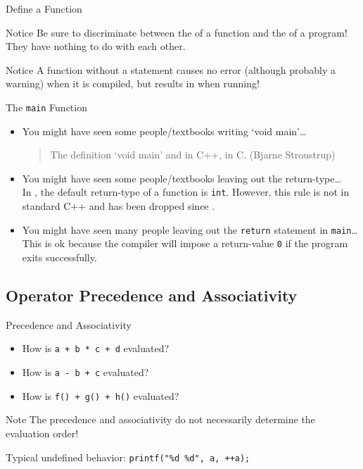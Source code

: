 \documentclass[handout]{beamer}
\begin{document}
\begin{frame}{Define a Function}
    \begin{alertblock}{Notice}
        Be sure to discriminate between the  of a function and the  of a program! They have nothing to do with each other.
    \end{alertblock}
    \pause
    \begin{alertblock}{Notice}
        A  function without a  statement causes no error (although probably a warning) when it is compiled, but results in  when running!
    \end{alertblock}
\end{frame}

\begin{frame}{The \texttt{main} Function}
    \begin{itemize}
        \item You might have seen some people/textbooks writing `void main'\dots\\[0.7em]
        \pause
        \begin{quote}
            The definition `void main'  and  in C++,  in C. (Bjarne Stroustrup)
        \end{quote}
        \pause
        \item You might have seen some people/textbooks leaving out the return-type\dots\\[0.7em]
        \pause
        In , the default return-type of a function is \texttt{int}. However, this rule is not in standard C++ and has been dropped since . 
        \pause
        \item You might have seen many people leaving out the \texttt{return} statement in \texttt{main}\dots\\[0.7em]
        \pause
        This is ok because the compiler will impose a return-value \texttt{0} if the program exits successfully.
    \end{itemize}
\end{frame}

\subsection{Operator Precedence and Associativity}

\begin{frame}{Precedence and Associativity}
    \begin{itemize}
        \item How is \texttt{a + b * c + d} evaluated?
        \item How is \texttt{a - b + c} evaluated?
        \item How is \texttt{f() + g() + h()} evaluated?
    \end{itemize}
    \pause
    \begin{alertblock}{Note}
        The precedence and associativity do not necessarily determine the evaluation order!
    \end{alertblock}
    \pause
    Typical undefined behavior: \texttt{printf("\%d \%d", a, ++a);}
\end{frame}
\end{document}
